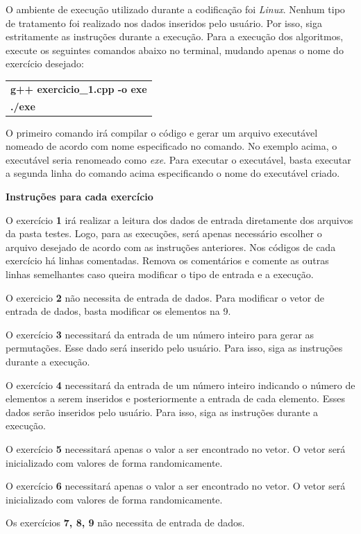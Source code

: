 \documentclass[12pt,a4paper]{article}
\begin{document}
O ambiente de execução utilizado durante a codificação foi \textit{Linux}. Nenhum tipo de tratamento foi realizado nos dados inseridos pelo usuário. Por isso, siga estritamente as instruções durante a execução. Para a execução dos algoritmos, execute os seguintes comandos abaixo no terminal, mudando apenas o nome do exercício desejado:

\begin{table}[H]
	\centering
	\begin{tabular}{|l|}
		\hline
		\textbf{g++ exercicio\_1.cpp -o exe}\\		
		\textbf{./exe}\\
		\hline
	\end{tabular}
\end{table}

O primeiro comando irá compilar o código e gerar um arquivo executável nomeado de acordo com nome especificado no comando. No exemplo acima, o executável seria renomeado como \textit{exe}. Para executar o executável, basta executar a segunda linha do comando acima especificando o nome do executável criado.

\newpage

{\Large \textbf{Instruções para cada exercício}}

\vspace{0.5cm}


O exercício \textbf{1} irá realizar a leitura dos dados de entrada diretamente dos arquivos da pasta \textsf{testes}. Logo, para as execuções, será apenas necessário escolher o arquivo desejado de acordo com as instruções anteriores. Nos códigos de cada exercício há linhas comentadas. Remova os comentários e comente as outras linhas semelhantes caso queira modificar o tipo de entrada e a execução.

O exercicio \textbf{2} não necessita de entrada de dados. Para modificar o vetor de entrada de dados, basta modificar os elementos na \textsf{9}. 

O exercício \textbf{3} necessitará da entrada de um número inteiro para gerar as permutações. Esse dado será inserido pelo usuário. Para isso, siga as instruções durante a execução.

O exercício \textbf{4} necessitará da entrada de um número inteiro indicando o número de elementos a serem inseridos e posteriormente a entrada de cada elemento. Esses dados serão inseridos pelo usuário. Para isso, siga as instruções durante a execução.

O exercício \textbf{5} necessitará apenas o valor a ser encontrado no vetor. O vetor será inicializado com valores de forma randomicamente.

O exercício \textbf{6} necessitará apenas o valor a ser encontrado no vetor. O vetor será inicializado com valores de forma randomicamente.

Os exercícios \textbf{7, 8, 9} não necessita de entrada de dados.
\end{document}

